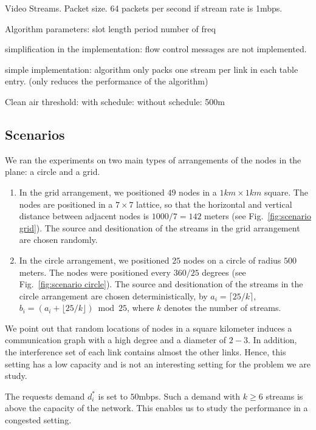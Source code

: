 \documentclass[12pt]{article}
\newenvironment{proof sketch}[1]{\noindent {\emph{Proof sketch of #1:}}}{\hfill \qed}
\begin{document}
Video Streams. Packet size.
64 packets per second if stream rate is 1mbps.

Algorithm parameters:
slot length
period
number of freq

simplification in the implementation:
flow control messages are not implemented.

simple implementation:
algorithm only packs one stream per link in each table entry.
(only reduces the performance of the algorithm)

Clean air threshold:
with schedule:
without schedule: 500m

\subsection{Scenarios}
We ran the experiments on two main types of arrangements of the nodes
in the plane: a circle and a grid.

\begin{enumerate}
\item In the grid arrangement, we positioned $49$ nodes in a
  $1km\times 1km$ square. The nodes are positioned in a $7\times 7$
  lattice, so that the horizontal and vertical distance between
  adjacent nodes is $1000/7=142$ meters (see Fig.~\ref{fig:scenario
    grid}).  The source and desitionation of the streams in the grid
  arrangement are chosen randomly.

\item In the circle arrangement, we positioned $25$ nodes on a circle
  of radius $500$ meters.  The nodes were positioned every $360/25$
  degrees (see Fig.~\ref{fig:scenario circle}). The source and
  desitionation of the streams in the circle arrangement are chosen
  deterministically, by $a_i=\lceil 25/k \rceil$, $b_i=(a_i + \lfloor
  25/k \rfloor) \bmod 25$, where $k$ denotes the number of streams.
\end{enumerate}

We point out that random locations of nodes in a square kilometer
induces a communication graph with a high degree and a diameter of
$2-3$. In addition, the interference set of each link contains almost
the other links. Hence, this setting has a low capacity and is not an
interesting setting for the problem we are study.

The requests demand $d^*_i$ is set to $50$mbps. Such a demand with
$k\geq 6$ streams is above the capacity of the network. This enables
us to study the performance in a congested setting.
\end{document}
